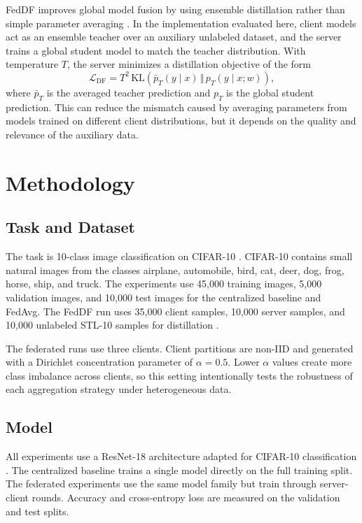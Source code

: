 \documentclass[11pt]{article}
\begin{document}
FedDF improves global model fusion by using ensemble distillation rather than simple parameter averaging \cite{lin2020ensemble}. In the implementation evaluated here, client models act as an ensemble teacher over an auxiliary unlabeled dataset, and the server trains a global student model to match the teacher distribution. With temperature $T$, the server minimizes a distillation objective of the form
\begin{equation}
    \mathcal{L}_{\mathrm{DF}} = T^2\,\mathrm{KL}\!\left(\bar{p}_T(y\mid x)\,\Vert\,p_T(y\mid x;w)\right),
\end{equation}
where $\bar{p}_T$ is the averaged teacher prediction and $p_T$ is the global student prediction. This can reduce the mismatch caused by averaging parameters from models trained on different client distributions, but it depends on the quality and relevance of the auxiliary data.

\section{Methodology}

\subsection{Task and Dataset}

The task is 10-class image classification on CIFAR-10 \cite{krizhevsky2009learning}. CIFAR-10 contains small natural images from the classes airplane, automobile, bird, cat, deer, dog, frog, horse, ship, and truck. The experiments use 45,000 training images, 5,000 validation images, and 10,000 test images for the centralized baseline and FedAvg. The FedDF run uses 35,000 client samples, 10,000 server samples, and 10,000 unlabeled STL-10 samples for distillation \cite{coates2011analysis}.

The federated runs use three clients. Client partitions are non-IID and generated with a Dirichlet concentration parameter of $\alpha=0.5$. Lower $\alpha$ values create more class imbalance across clients, so this setting intentionally tests the robustness of each aggregation strategy under heterogeneous data.

\subsection{Model}

All experiments use a ResNet-18 architecture adapted for CIFAR-10 classification \cite{he2016deep}. The centralized baseline trains a single model directly on the full training split. The federated experiments use the same model family but train through server-client rounds. Accuracy and cross-entropy loss are measured on the validation and test splits.
\end{document}
